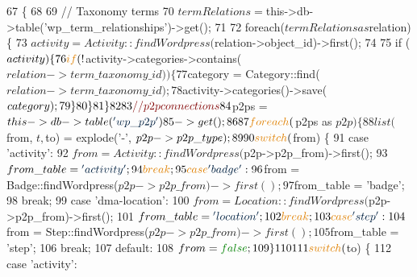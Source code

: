 \begin{DoxyCode}
67     \{  
68 
69         \textcolor{comment}{// Taxonomy terms}
70         $termRelations = $this->db->table(\textcolor{stringliteral}{'wp\_term\_relationships'})->get();
71 
72         \textcolor{keywordflow}{foreach}($termRelations as $relation) \{
73             $activity = Activity::findWordpress($relation->object\_id)->first();
74             
75             \textcolor{keywordflow}{if} ($activity) \{
76                 \textcolor{keywordflow}{if} (!$activity->categories->contains($relation->term\_taxonomy\_id)) \{
77                     $category = Category::find($relation->term\_taxonomy\_id);
78                     $activity->categories()->save($category);
79                 \}
80             \}
81         \}
82 
83         \textcolor{comment}{// p2p connections}
84         $p2ps = $this->db->table(\textcolor{stringliteral}{'wp\_p2p'})
85             ->get();
86 
87         \textcolor{keywordflow}{foreach}($p2ps as $p2p) \{
88             list($from, $t, $to) = explode(\textcolor{charliteral}{'-'}, $p2p->p2p\_type);
89 
90             \textcolor{keywordflow}{switch}($from) \{
91                 \textcolor{keywordflow}{case} \textcolor{stringliteral}{'activity'}:
92                     $from = Activity::findWordpress($p2p->p2p\_from)->first();
93                     $from\_table = \textcolor{stringliteral}{'activity'};
94                     \textcolor{keywordflow}{break};
95                 \textcolor{keywordflow}{case} \textcolor{stringliteral}{'badge'}:
96                     $from = Badge::findWordpress($p2p->p2p\_from)->first();
97                     $from\_table = \textcolor{stringliteral}{'badge'};
98                     \textcolor{keywordflow}{break};
99                 \textcolor{keywordflow}{case} \textcolor{stringliteral}{'dma-location'}:
100                     $from = Location::findWordpress($p2p->p2p\_from)->first();
101                     $from\_table = \textcolor{stringliteral}{'location'};
102                     \textcolor{keywordflow}{break};
103                 \textcolor{keywordflow}{case} \textcolor{stringliteral}{'step'}:
104                     $from = Step::findWordpress($p2p->p2p\_from)->first();
105                     $from\_table = \textcolor{stringliteral}{'step'};
106                     \textcolor{keywordflow}{break};
107                 \textcolor{keywordflow}{default}:
108                     $from = \textcolor{keyword}{false};
109             \}
110 
111             \textcolor{keywordflow}{switch}($to) \{
112                 \textcolor{keywordflow}{case} \textcolor{stringliteral}{'activity'}:

\end{DoxyCode}
